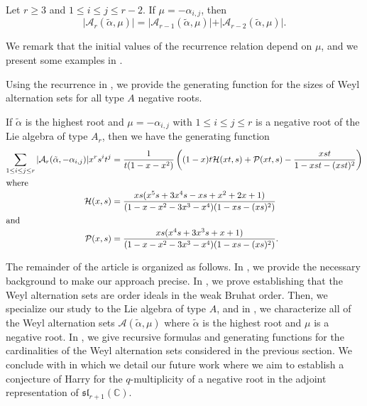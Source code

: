 \documentclass{amsart}
\newenvironment{customthm}[1] {\renewcommand\theinnercustomthm{#1}\innercustomthm}
  {\endinnercustomthm}
\newenvironment{customprop}[1]{\renewcommand\theinnercustomprop{#1}\innercustomprop}
  {\endinnercustomprop}
\theoremstyle{definition}
\newcommand{\hroot}{\tilde{\alpha}}
\newcommand{\calA}{\mathcal{A}}
\newcommand{\calP}{\mathcal{P}}
\newcommand{\calH}{\mathcal{H}}
\begin{document}
\begin{customprop} {\ref{prop:RecurrenceOnSizesFixedRoot}}
Let $r\geq 3$ and 
 $1 \leq i \leq j \leq r-2 $. If $\mu = -\alpha_{i,j}$, 
then
\[
\vert \mathcal{A}_r(\hroot, \mu) \vert = \vert \mathcal{A}_{r-1}(\hroot, \mu) \vert  + \vert \mathcal{A}_{r-2}(\hroot, \mu) \vert. 
\]
\end{customprop}

We remark that the initial values of the recurrence relation depend on $\mu$, and we present some examples in .

Using the recurrence in , we provide the generating function for the sizes of Weyl alternation sets for all type $A$ negative roots.



\begin{customthm}{\ref{thm:gen_func}}
    If $\hroot$ is the highest root and $\mu=-\alpha_{i,j}$ with $1\leq i\leq j\leq r$
 is a negative root of the Lie algebra of type $A_r$, then we have the generating function
\begin{align*}
\sum_{1\leq i\leq j\leq r} \vert \mathcal{A}_r(\hroot, -\alpha_{i,j})\vert x^r s^it^j &= \frac{1}{t(1-x-x^2)}\left((1-x)t\calH(xt,s)+\calP(xt,s)-\frac{xst}{1-xst-(xst)^2}\right)\\\intertext{where}
\calH(x,s)&=\frac{xs(x^5s+3x^4s-xs+x^2+2x+1)}{(1-x-x^2-3x^3-x^4)(1-xs-(xs)^2)}\\\intertext{and}
\calP(x,s)&=\frac{xs(x^4s+3x^3s+x+1)}{(1-x-x^2-3x^3-x^4)(1-xs-(xs)^2)}.
\end{align*} 
\end{customthm}


The remainder of the article is organized as follows. In , we provide the necessary background to make our approach precise. In , we prove  establishing that the Weyl alternation sets are order ideals in the weak Bruhat order. 
Then, we specialize our study to the Lie algebra of type $A$, and in , we characterize all of the Weyl alternation sets $\calA(\hroot,\mu)$ where $\hroot$ is the highest root and $\mu$ is a negative root. 
In , we give recursive formulas and generating functions for the cardinalities of the Weyl alternation sets considered in the previous section. 
We conclude with  in which we detail our future work where we aim to establish a conjecture of Harry for the $q$-multiplicity of a negative root in the adjoint representation of $\mathfrak{sl}_{r+1}(\mathbb{C})$.
\end{document}
